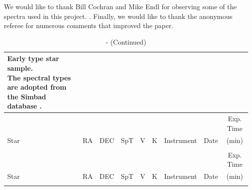 We would like to thank Bill Cochran and Mike Endl for observing some of the spectra used in this project. . Finally, we would like to thank the anonymous referee for numerous comments that improved the paper.








\begin{scriptsize}
\begin{longtable}{lllcccrcc}
    
    \caption{Early type star sample.\\
             The spectral types are adopted from the Simbad database \citep{Simbad}. \label{paper5_tab:earlycal}} 
    \\ \hline
     & & & & & & & & Exp. Time \\
     Star & RA & DEC & SpT & V & K & Instrument  & Date  & (min) \\ \hline
    \endfirsthead

    \caption{ - (Continued)}
    \\ \hline
    & & & & & & & & Exp. Time \\
     Star & RA & DEC & SpT & V & K & Instrument  & Date  & (min) \\ \hline
    \endhead

    \hline
    \endfoot

    \hline
    \endlastfoot


\end{longtable}
\end{scriptsize}
